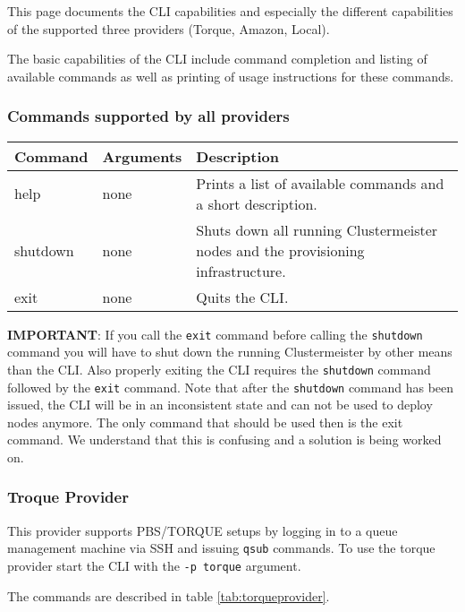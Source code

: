 This page documents the CLI capabilities and especially the different capabilities of the supported three providers (Torque, Amazon, Local).

The basic capabilities of the CLI include command completion and listing of available commands as well as printing of usage instructions for these commands.

\subsubsection{Commands supported by all providers}


\begin{table}[h]
\centering
\begin{tabular}{|l|l| p{7cm}|}
\hline
\textbf{Command} & \textbf{Arguments} & \textbf{Description} \\ \hline
help & none & Prints a list of available commands and a short description. \\ \hline
shutdown & none & Shuts down all running Clustermeister nodes and the provisioning infrastructure. \\ \hline
exit & none & Quits the CLI. \\ \hline
\end{tabular}
\end{table}

\textbf{IMPORTANT}: If you call the \texttt{exit} command before calling the \texttt{shutdown} command you will have to shut down the running Clustermeister by other means than the CLI. Also properly exiting the CLI requires the \texttt{shutdown} command followed by the \texttt{exit} command. Note that after the \texttt{shutdown} command has been issued, the CLI will be in an inconsistent state and can not be used to deploy nodes anymore. The only command that should be used then is the exit command. We understand that this is confusing and a solution is being worked on.


\subsubsection{Troque Provider}

This provider supports PBS/TORQUE setups by logging in to a queue management machine via SSH and issuing \texttt{qsub} commands. To use the torque provider start the CLI with the \texttt{-p torque} argument.

The commands are described in table \ref{tab:torqueprovider}.

